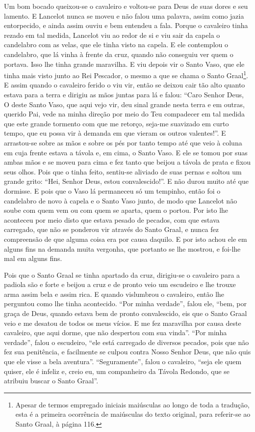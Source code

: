 Um bom bocado queixou-se o cavaleiro e voltou-se para Deus de suas dores e seu
lamento. E Lancelot nunca se moveu e não falou uma palavra, assim como jazia
entorpecido, e ainda assim ouviu e bem entendeu a fala. Porque o cavaleiro
tinha rezado em tal medida, Lancelot viu ao redor de si e viu sair da capela o
candelabro com as velas, que ele tinha visto na capela. E ele contemplou o
candelabro, que lá vinha à frente da cruz, quando não conseguiu ver quem o
portava. Isso lhe tinha grande maravilha. E viu depois vir o Santo Vaso, que
ele tinha mais visto junto ao Rei Pescador, o mesmo a que se chama o Santo
Graal\footnote{ Apesar de termos empregado iniciais maiúsculas ao longo de toda
a tradução, esta é a primeira ocorrência de maiúsculas do texto original, para
referir-se ao Santo Graal, à página 116.}. E assim quando o
cavaleiro ferido o viu vir, então se deixou cair tão alto quanto estava para a
terra e dirigiu as mãos juntas para lá e falou: “Caro Senhor Deus, O deste
Santo Vaso, que aqui vejo vir, deu sinal grande nesta terra e em outras,
querido Pai, vede na minha direção por meio do Teu compadecer em tal medida que
este grande tormento com que me retorço, seja-me suavizado em curto tempo, que
eu possa vir à demanda em que vieram os outros valentes!”. E arrastou-se sobre
as mãos e sobre os pés por tanto tempo até que veio à coluna em cuja frente
estava a távola e, em cima, o Santo Vaso. E ele se tomou por suas ambas mãos e
se moveu para cima e fez tanto que beijou a távola de prata e fixou seus olhos.
Pois que o tinha feito, sentiu-se aliviado de suas pernas e soltou um grande
grito: “Hei, Senhor Deus, estou convalescido!”. E não durou muito até que
dormisse. E pois que o Vaso lá permaneceu só um tempinho, então foi o
candelabro de novo à capela e o Santo Vaso junto, de modo que Lancelot não
soube com quem vem ou com quem se aparta, quem o portou. Por isto lhe aconteceu
por meio disto que estava pesado de pecados, com que estava carregado, que não
se ponderou vir através do Santo Graal, e nunca fez compreensão de que alguma
coisa era por causa daquilo. E por isto achou ele em alguns fins na demanda
muita vergonha, que portanto se lhe mostrou, e foi-lhe mal em alguns fins. 

Pois que o Santo Graal se tinha apartado da cruz, dirigiu-se o cavaleiro para a
padiola são e forte e beijou a cruz e de pronto veio um escudeiro e lhe trouxe
arma assim bela e assim rica. E quando vislumbrou o cavaleiro, então lhe
perguntou como lhe tinha acontecido. “Por minha verdade”, falou ele, “bem, por
graça de Deus, quando estava bem de pronto convalescido, eis que o Santo Graal
veio e me desatou de todos os meus vícios. E me fez maravilha por causa deste
cavaleiro, que aqui dorme, que não despertou com sua vinda”. “Por minha
verdade”, falou o escudeiro, “ele está carregado de diversos pecados, pois que
não fez sua penitência, e facilmente se culpou contra Nosso Senhor Deus, que
não quis que ele visse a bela aventura”. “Seguramente”, falou o cavaleiro,
“seja ele quem quiser, ele é infeliz e, creio eu, um companheiro da Távola
Redondo, que se atribuiu buscar o Santo Graal”.

